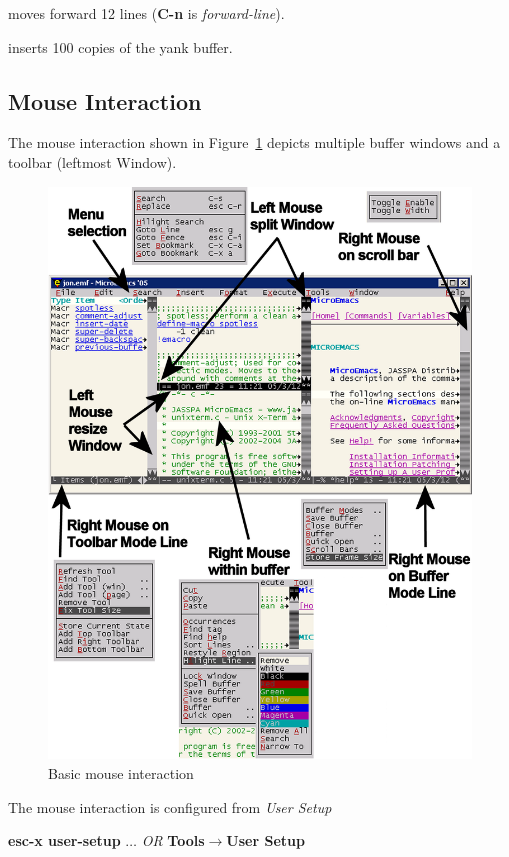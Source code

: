 \documentclass[11pt,a4paper,pdftex]{article}
\begin{document}

  moves forward 12 lines (\textbf{C-n} is \textit{forward-line}).


  inserts 100 copies of the yank buffer.

\subsection{Mouse Interaction}

  The mouse interaction shown in Figure~\ref{fig:basicmouse} depicts multiple
  buffer windows and a toolbar (leftmost Window).

  \begin{figure}[!h]
    \begin{center}
      \includegraphics[keepaspectratio,width=.75\textwidth]{basicmouse}
      \caption{Basic mouse interaction}
      \label{fig:basicmouse}
    \end{center}
  \end{figure}

  The mouse interaction is configured from \textit{User Setup}

  \textbf{esc-x user-setup} $\dots$ \textit{OR}\newline
  \textbf{Tools$\rightarrow$User Setup}
\end{document}
